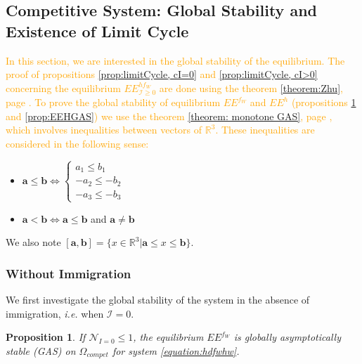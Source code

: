 \documentclass{article}
\newcommand{\cI}{\mathcal{I}}
\newcommand{\R}{\mathbb{R}}
\newcommand{\vdeux}[1]{\textcolor{orange}{#1}}
\newtheorem{prop}[theorem]{Proposition}
\theoremstyle{definition}
\theoremstyle{remark}
\begin{document}
\subsection{Competitive System: Global Stability and Existence of Limit Cycle}
\vdeux{
In this section, we are interested in the global stability of the equilibrium. The proof of propositions \ref{prop:limitCycle, cI=0} and \ref{prop:limitCycle, cI>0} concerning the equilibrium $EE^{hf_W}_{\cI \geq 0}$ are done using the theorem \ref{theorem:Zhu}, page \pageref{theorem:Zhu}. To prove the global stability of equilibrium $EE^{f_W}$ and $EE^{h}$ (propositions \ref{prop:EEFGAS} and \ref{prop:EEHGAS}) we use the theorem \ref{theorem: monotone GAS}, page \pageref{theorem: monotone GAS}, which involves inequalities between vectors of $\R^3$. These inequalities are considered in the following sense:}
\begin{itemize}
\item $\mathbf{a} \leq \mathbf{b} \Leftrightarrow \left\lbrace \begin{array}{l} 
a_1 \leq b_1 \\ -a_2 \leq - b_2 \\ -a_3 \leq - b_3
\end{array} \right.$
\item $\mathbf{a} < \mathbf{b} \Leftrightarrow \mathbf{a} \leq \mathbf{b}$ and $\mathbf{a}\neq \mathbf{b}$
\end{itemize}
We also note $[\mathbf{a},\mathbf{b}] = \lbrace x \in \mathbb{R}^3 | \mathbf{a} \leq x \leq \mathbf{b} \rbrace$.


\subsubsection{Without Immigration}
We first investigate the global stability of the system in the absence of immigration, \textit{i.e.} when $\cI = 0$.
\begin{prop}\label{prop:EEFGAS}If $\mathcal{N}_{I =0} \leq 1
$, the equilibrium $EE^{f_W}$ is globally asymptotically stable (GAS) on $\Omega_{compet}$ for system \eqref{equation:hdfwhw}.
\end{prop}
\end{document}
